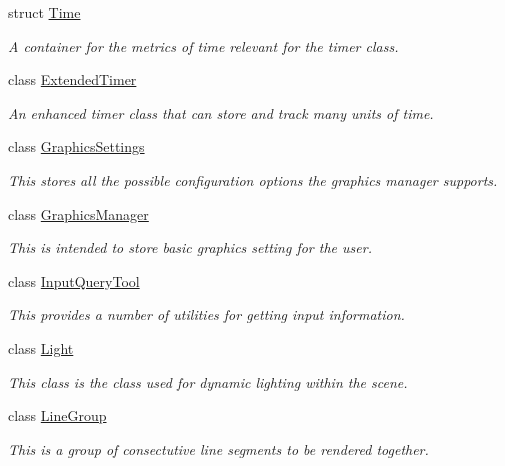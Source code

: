 \begin{DoxyCompactItemize}
struct \hyperlink{structphys_1_1Time}{Time}
\begin{DoxyCompactList}\small\item\em A container for the metrics of time relevant for the timer class. \item\end{DoxyCompactList}\item 
class \hyperlink{classphys_1_1ExtendedTimer}{ExtendedTimer}
\begin{DoxyCompactList}\small\item\em An enhanced timer class that can store and track many units of time. \item\end{DoxyCompactList}\item 
class \hyperlink{structphys_1_1GraphicsSettings}{GraphicsSettings}
\begin{DoxyCompactList}\small\item\em This stores all the possible configuration options the graphics manager supports. \item\end{DoxyCompactList}\item 
class \hyperlink{classphys_1_1GraphicsManager}{GraphicsManager}
\begin{DoxyCompactList}\small\item\em This is intended to store basic graphics setting for the user. \item\end{DoxyCompactList}\item 
class \hyperlink{classphys_1_1InputQueryTool}{InputQueryTool}
\begin{DoxyCompactList}\small\item\em This provides a number of utilities for getting input information. \item\end{DoxyCompactList}\item 
class \hyperlink{classphys_1_1Light}{Light}
\begin{DoxyCompactList}\small\item\em This class is the class used for dynamic lighting within the scene. \item\end{DoxyCompactList}\item 
class \hyperlink{classphys_1_1LineGroup}{LineGroup}
\begin{DoxyCompactList}\small\item\em This is a group of consectutive line segments to be rendered together. \item\end{DoxyCompactList}\item 

\end{DoxyCompactItemize}
